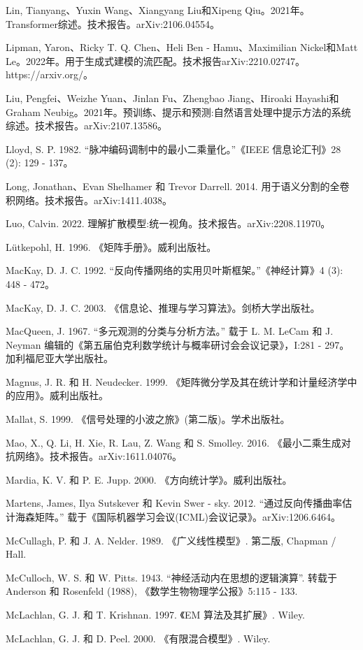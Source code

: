 \documentclass[10pt]{article}
\begin{document}
Lin, Tianyang、Yuxin Wang、Xiangyang Liu和Xipeng Qiu。2021年。Transformer综述。技术报告。arXiv:2106.04554。

Lipman, Yaron、Ricky T. Q. Chen、Heli Ben - Hamu、Maximilian Nickel和Matt Le。2022年。用于生成式建模的流匹配。技术报告arXiv:2210.02747。https://arxiv.org/。

Liu, Pengfei、Weizhe Yuan、Jinlan Fu、Zhengbao Jiang、Hiroaki Hayashi和Graham Neubig。2021年。预训练、提示和预测:自然语言处理中提示方法的系统综述。技术报告。arXiv:2107.13586。

Lloyd, S. P. 1982. “脉冲编码调制中的最小二乘量化。”《IEEE 信息论汇刊》28 (2): 129 - 137。

Long, Jonathan、Evan Shelhamer 和 Trevor Darrell. 2014. 用于语义分割的全卷积网络。技术报告。arXiv:1411.4038。

Luo, Calvin. 2022. 理解扩散模型:统一视角。技术报告。arXiv:2208.11970。

Lütkepohl, H. 1996. 《矩阵手册》。威利出版社。

MacKay, D. J. C. 1992. “反向传播网络的实用贝叶斯框架。”《神经计算》4 (3): 448 - 472。

MacKay, D. J. C. 2003. 《信息论、推理与学习算法》。剑桥大学出版社。

MacQueen, J. 1967. “多元观测的分类与分析方法。” 载于 L. M. LeCam 和 J. Neyman 编辑的《第五届伯克利数学统计与概率研讨会会议记录》，I:281 - 297。加利福尼亚大学出版社。

Magnus, J. R. 和 H. Neudecker. 1999. 《矩阵微分学及其在统计学和计量经济学中的应用》。威利出版社。

Mallat, S. 1999. 《信号处理的小波之旅》(第二版)。学术出版社。

Mao, X., Q. Li, H. Xie, R. Lau, Z. Wang 和 S. Smolley. 2016. 《最小二乘生成对抗网络》。技术报告。arXiv:1611.04076。

Mardia, K. V. 和 P. E. Jupp. 2000. 《方向统计学》。威利出版社。

Martens, James, Ilya Sutskever 和 Kevin Swer - sky. 2012. “通过反向传播曲率估计海森矩阵。” 载于《国际机器学习会议(ICML)会议记录》。arXiv:1206.6464。

McCullagh, P. 和 J. A. Nelder. 1989. 《广义线性模型》. 第二版, Chapman / Hall.

McCulloch, W. S. 和 W. Pitts. 1943. “神经活动内在思想的逻辑演算”. 转载于 Anderson 和 Rosenfeld (1988), 《数学生物物理学公报》5:115 - 133.

McLachlan, G. J. 和 T. Krishnan. 1997. 《EM 算法及其扩展》. Wiley.

McLachlan, G. J. 和 D. Peel. 2000. 《有限混合模型》. Wiley.
\end{document}
